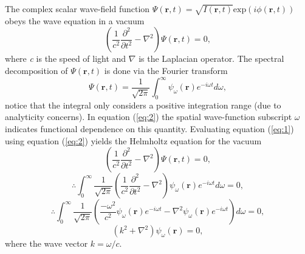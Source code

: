 \documentclass[10pt, a4paper, singlespacing]{report}
\begin{document}
The complex scalar wave-field function $\Psi(\mathbf{r},t) = \sqrt{I(\mathbf{r},t)} \mathrm{exp}(i \phi(\mathbf{r},t))$ obeys the wave equation in a vacuum
\begin{equation}\label{eq:1}
\left ( \frac{1}{c^2} \frac{\partial^2 }{\partial t^2} -\nabla^2 \right ) \Psi(\mathbf{r},t) = 0,
\end{equation} 
where \textit{c} is the speed of light and $\nabla$ is the Laplacian operator.
The spectral decomposition of $\Psi(\mathbf{r},t)$ is done via the Fourier transform
\begin{equation}\label{eq:2}
\Psi(\mathbf{r},t) = \frac{1}{\sqrt{2 \pi}} \int_{0}^{\infty}\psi_{\omega}(\mathbf{r}) e^{-i\omega t}d\omega,
\end{equation}
notice that the integral only considers a positive integration range (due to analyticity concerns\cite{PagsTutes}). In equation (\ref{eq:2}) the spatial wave-function subscript $\omega$ indicates functional dependence on this quantity\cite{Pags2006}. Evaluating equation (\ref{eq:1}) using equation (\ref{eq:2}) yields the Helmholtz equation for the vacuum
\begin{equation}\label{eq:3}
\left ( \frac{1}{c^2}\frac{\partial^2}{\partial t^{2}} - \nabla^{2}  \right )\Psi(\mathbf{r},t) = 0,
\end{equation}
\begin{equation}\label{eq:4}
\therefore \int_{0}^{\infty} \frac{1}{\sqrt{2 \pi}} \left ( \frac{1}{c^2}\frac{\partial^2}{\partial t^{2}} -\nabla^{2}  \right )  
\psi_{\omega}(\mathbf{r}) e^{-i\omega t}d\omega = 0,
\end{equation}
\begin{equation}\label{eq:5}
\therefore \int_{0}^{\infty} \frac{1}{\sqrt{2 \pi}} \left ( \frac{-\omega^2}{c^2}\psi_{\omega}(\mathbf{r}) e^{-i\omega t} -\nabla^{2}\psi_{\omega}(\mathbf{r}) e^{-i\omega t} \right ) d\omega  
 = 0,
\end{equation}
\begin{equation}\label{eq:6}
\left ( k^2 + \nabla^{2} \right ) \psi_{\omega}(\mathbf{r})  
 = 0,
\end{equation}
where the wave vector $k = \omega/c$.
\end{document}
